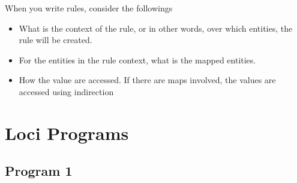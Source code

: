 \par When you write rules, consider the followings 
\begin{itemize}
\item  What is the context of the rule, or in other words, over which
entities, the rule will be created. 
\item  For the entities in the rule context, what is the mapped entities.
\item  How the value are accessed. If there are maps involved, the 
       values are accessed using indirection
\end{itemize}

\section { Loci Programs }
\subsection { Program 1 }
